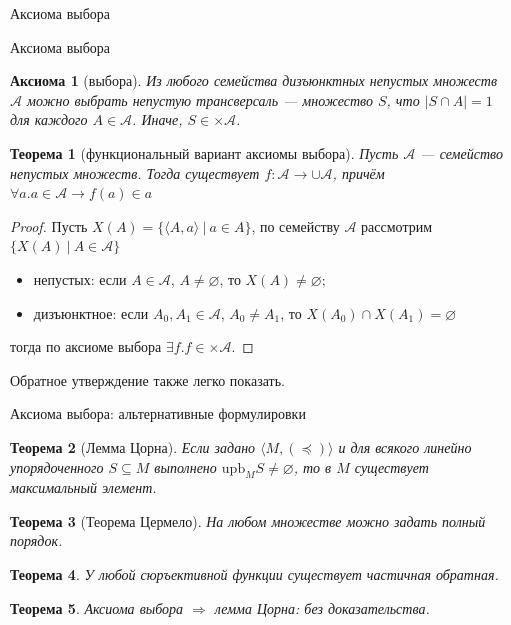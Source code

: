 \documentclass[aspectratio=169]{beamer}
\newtheorem{thm}{Теорема}[section]
\newtheorem{axm}{Аксиома}[section]
\begin{document}
\newcommand\doubleplus{+\kern-1.3ex+\kern0.8ex}
\newcommand\mdoubleplus{\ensuremath{\mathbin{+\mkern-10mu+}}}

\begin{frame}
\begin{center}\LARGE Аксиома выбора\end{center}
\end{frame}

\begin{frame}{Аксиома выбора}
\begin{axm}[выбора]
Из любого семейства дизъюнктных непустых множеств $\mathcal{A}$ можно выбрать непустую трансверсаль --- 
множество $S$, что $|S \cap A| = 1$ для каждого $A\in\mathcal{A}$. Иначе, $S \in \times \mathcal{A}$.
\end{axm}

\begin{thm}[функциональный вариант аксиомы выбора]
Пусть $\mathcal{A}$ --- семейство непустых множеств. Тогда существует
$f : \mathcal{A} \rightarrow \cup \mathcal{A}$, причём $\forall a.a \in \mathcal{A} \rightarrow f(a) \in a$
\end{thm}

\begin{proof}
Пусть $X(A) = \{ \langle A, a \rangle \ |\ a \in A \}$, 
по семейству $\mathcal{A}$ рассмотрим $\{X(A)\ |\ A\in\mathcal{A}\}$
\begin{itemize}
\item непустых: если $A\in\mathcal{A}$, $A \ne \varnothing$, то $X(A) \ne \varnothing$;
\item дизъюнктное: если $A_0,A_1\in\mathcal{A}$, $A_0 \ne A_1$, то $X(A_0) \cap X(A_1) = \varnothing$
\end{itemize}
тогда по аксиоме выбора $\exists f.f \in \times \mathcal{A}$.
\end{proof}
Обратное утверждение также легко показать.
\end{frame}

\begin{frame}{Аксиома выбора: альтернативные формулировки}
\begin{thm}[Лемма Цорна]
Если задано $\langle M, (\preceq) \rangle$ и для всякого линейно упорядоченного $S \subseteq M$ выполнено
$\text{upb}_M S \ne \varnothing$, то в $M$ существует максимальный элемент.
\end{thm}
\begin{thm}[Теорема Цермело]
На любом множестве можно задать полный порядок.
\end{thm}
\begin{thm}
У любой сюръективной функции существует частичная обратная.
\end{thm}

\begin{thm}
Аксиома выбора $\Rightarrow$ лемма Цорна: без доказательства.
\end{thm}
\end{frame}
\end{document}
